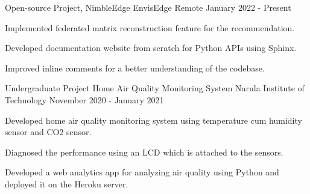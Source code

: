 

\begin{cventries}

  \cventry
    {Open-source Project, NimbleEdge} %
    {EnvisEdge} %
    {Remote} %
    {January 2022 - Present} %
    {
      \begin{cvitems} %
     \item {Implemented federated matrix reconstruction feature for the recommendation.}
      \item {Developed documentation website from scratch for Python APIs using Sphinx.}
      \item {Improved inline comments for a better understanding of the codebase.}
      \end{cvitems}
    }



  \cventry
    {Undergraduate Project} %
    {Home Air Quality Monitoring System} %
    {Narula Institute of Technology} %
    {November 2020 - January  2021} %
    {
      \begin{cvitems} %
        \item {Developed home air quality monitoring system using temperature cum humidity sensor and CO2 sensor.}
	\item{ Diagnosed the performance using an LCD which is attached to the sensors.}
        \item{Developed a web analytics app for analyzing air quality using Python and deployed it on the Heroku server.}
      \end{cvitems}
    }

\end{cventries}

